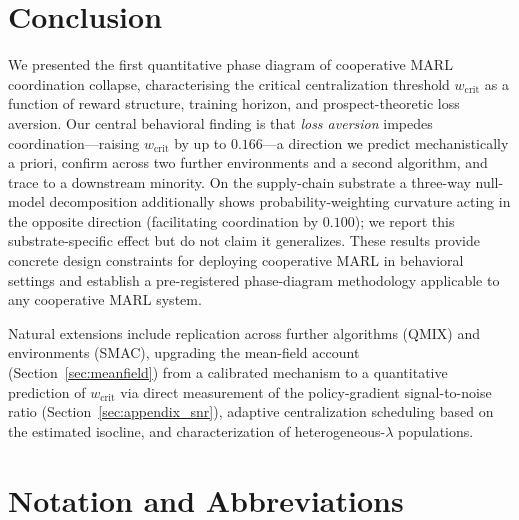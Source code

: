 \documentclass[letterpaper]{article}
\theoremstyle{plain}
\newcommand{\wcrit}{w_{\mathrm{crit}}}
\begin{document}
\section{Conclusion}
\label{sec:conclusion}

We presented the first quantitative phase diagram of cooperative MARL
coordination collapse, characterising the critical centralization threshold
$\wcrit$ as a function of reward structure, training horizon, and
prospect-theoretic loss aversion.
Our central behavioral finding is that \emph{loss aversion} impedes
coordination---raising $\wcrit$ by up to $0.166$---a direction we predict
mechanistically a priori, confirm across two further environments and a second
algorithm, and trace to a downstream minority. On the supply-chain substrate a
three-way null-model decomposition additionally shows probability-weighting
curvature acting in the opposite direction (facilitating coordination by
$0.100$); we report this substrate-specific effect but do not claim it
generalizes.
These results provide concrete design constraints for deploying cooperative
MARL in behavioral settings and establish a pre-registered phase-diagram
methodology applicable to any cooperative MARL system.

Natural extensions include replication across further algorithms (QMIX) and
environments (SMAC), upgrading the mean-field account
(Section~\ref{sec:meanfield}) from a calibrated mechanism to a quantitative
prediction of $\wcrit$ via direct measurement of the policy-gradient
signal-to-noise ratio (Section~\ref{sec:appendix_snr}), adaptive centralization
scheduling based on the estimated isocline, and characterization of
heterogeneous-$\lambda$ populations.



\appendix

\section{Notation and Abbreviations}
\label{sec:appendix_notation}
\end{document}
